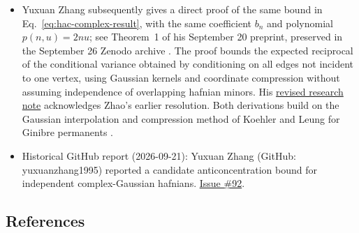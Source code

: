 \begin{itemize}
  \item Yuxuan Zhang subsequently gives a direct proof of the same bound in Eq.~\eqref{eq:hac-complex-result}, with the same coefficient $b_n$ and polynomial $p(n,u)=2nu$; see Theorem~1 of his September 20 preprint, preserved in the September 26 Zenodo archive .
The proof bounds the expected reciprocal of the conditional variance obtained by conditioning on all edges not incident to one vertex, using Gaussian kernels and coordinate compression without assuming independence of overlapping hafnian minors.
His \href{https://yuxuanzhang1995.github.io/agentic-research/complex-gaussian-hafnian/}{revised research note} acknowledges Zhao's earlier resolution.
Both derivations build on the Gaussian interpolation and compression method of Koehler and Leung for Ginibre permanents .

  \item Historical GitHub report (2026-09-21): Yuxuan Zhang (GitHub: yuxuanzhang1995) reported a candidate anticoncentration bound for independent complex-Gaussian hafnians. \href{https://github.com/Naixu-Guo/quantum-open-problems/issues/92}{Issue \#92}.
\end{itemize}

\subsection*{References}

